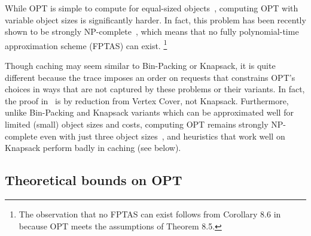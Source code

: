 \documentclass{article}
\begin{document}
While OPT is simple to compute for equal-sized objects~\cite{belady,mattson}, computing OPT with variable object sizes is significantly harder.
In fact, this problem has been recently shown to be strongly NP-complete~\cite{chorbak}, which means that no fully polynomial-time approximation scheme (FPTAS) can exist.%
\footnote{The observation that no FPTAS can exist follows from Corollary 8.6 in~\cite{vazirani2013approximation} because OPT meets the assumptions of Theorem 8.5.}

Though caching may seem similar to Bin-Packing or Knapsack, it is quite different because the trace imposes an order on requests that constrains OPT's choices in ways that are not captured by these problems or their variants.
In fact, the proof in~\cite{chorbak} is by reduction from Vertex Cover, not Knapsack.
Furthermore, unlike Bin-Packing and Knapsack variants which can be approximated well for limited (small) object sizes and costs,
computing OPT remains strongly NP-complete even with just three object sizes~\cite{folwarczny2017general},
and heuristics that work well on Knapsack perform badly in caching (see below).

\subsection{Theoretical bounds on OPT}\label{sec:bg:offlinevarsize}
\end{document}
